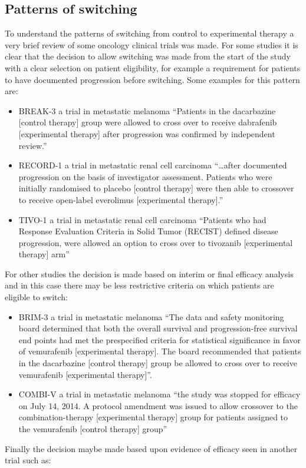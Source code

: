\subsection{Patterns of switching}

\label{S:chap_intro:pattern}
To understand the patterns of switching from control to experimental therapy a very brief review of some oncology clinical trials was made. For some studies it is clear that the decision to allow switching was made from the start of the study with a clear selection on patient eligibility, for example a requirement for patients to have documented progression before switching. Some examples for this pattern are:
\begin{itemize}

\item BREAK-3 a trial in metastatic melanoma ``Patients in the dacarbazine [control therapy] group were allowed to cross over to receive dabrafenib [experimental therapy] after progression was confirmed by independent review.'' \citep{BREAK3}

\item RECORD-1 a trial in metastatic renal cell carcinoma ``\ldots after documented progression on the basis of investigator assessment. Patients who were initially randomised to placebo [control therapy] were then able to crossover to receive open-label everolimus [experimental therapy].'' \citep{RECORD1}

\item TIVO-1 a trial in metastatic renal cell carcinoma ``Patients who had Response Evaluation Criteria in Solid Tumor (RECIST) defined disease progression, were allowed an option to cross over to tivozanib [experimental therapy] arm'' \citep{TIVO1}

\end{itemize}

For other studies the decision is made based on interim or final efficacy analysis and in this case there may be less restrictive criteria on which patients are eligible to switch:

\begin{itemize}

\item BRIM-3 a trial in metastatic melanoma ``The data and safety monitoring board determined that both the overall survival and progression-free survival end points had met the prespecified criteria for statistical significance in favor of vemurafenib [experimental therapy]. The board recommended that patients in the dacarbazine [control therapy] group be allowed to cross over to receive vemurafenib [experimental therapy]''. \citep{BRIM3}

\item COMBI-V a trial in metastatic melanoma ``the study was stopped for efficacy on July 14, 2014. A protocol amendment was issued to allow crossover to the combination-therapy [experimental therapy] group for patients assigned to the vemurafenib [control therapy] group'' \citep{COMBIV}

\end{itemize}
Finally the decision maybe made based upon evidence of efficacy seen in another trial such as:

